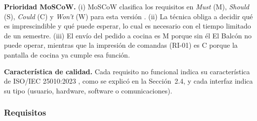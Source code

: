 \textbf{Prioridad MoSCoW.} (i) MoSCoW clasifica los requisitos en \emph{Must} (M), \emph{Should} (S), \emph{Could} (C) y \emph{Won't} (W) para esta versi\'on \cite{wiegers2013}.
(ii) La t\'ecnica obliga a decidir qu\'e es imprescindible y qu\'e puede esperar, lo cual es necesario con el tiempo limitado de un semestre. (iii) El env\'io del pedido a cocina es M porque sin \'el El Balc\'on no puede operar, mientras que la impresi\'on de comandas (RI-01) es C porque la pantalla de cocina ya cumple esa funci\'on.

\textbf{Caracter\'istica de calidad.} Cada requisito no funcional indica su caracter\'istica de ISO/IEC 25010:2023 \cite{iso25010}, como se explic\'o en la Secci\'on~2.4, y cada interfaz indica su tipo (usuario, hardware, software o comunicaciones).

\subsubsection{Requisitos}
\small
